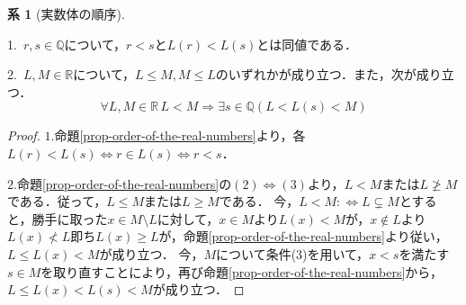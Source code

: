 \documentclass[uplatex, 12pt, dvipdfmx]{jsreport}
\theoremstyle{definition}
\newtheorem{corollary}[theorem]{系}
\theoremstyle{StatementsWithStar}
\theoremstyle{StatementsWithStar2}
\theoremstyle{StatementsWithStar3}
\theoremstyle{StatementsWithCCirc}
\theoremstyle{definition}
\begin{document}
\begin{corollary}[実数体の順序]\rm{}\label{corollary-order-of-the-real-numbers}　

    1.\, $r,s\in\mathbb{Q}$について，$r<s$と$L(r)<L(s)$とは同値である．
    
    2.\, $L,M\in\mathbb{R}$について，$L\leq M, M\leq L$のいずれかが成り立つ．また，次が成り立つ．
    \[ \forall L,M\in\mathbb{R} \, L<M \Longrightarrow \exists s\in\mathbb{Q} (L<L(s)<M) \]
\end{corollary}
\begin{proof}\rm{}
    $1.$命題\ref{prop-order-of-the-real-numbers}より，各$L(r)<L(s)\Leftrightarrow r\in L(s)\Leftrightarrow r<s$．

    $2.$命題\ref{prop-order-of-the-real-numbers}の$(2)\Leftrightarrow(3)$より，$L<M$または$L\ngeq M$である．従って，$L\le M$または$L\ge M$である．
    今，$L<M:\Leftrightarrow L\subsetneq M$とすると，勝手に取った$x\in M\setminus L$に対して，$x\in M$より$L(x)<M$が，$x\notin L$より$L(x)\nless L$即ち$L(x)\ge L$が，命題\ref{prop-order-of-the-real-numbers}より従い，$L\le L(x)<M$が成り立つ．
    今，$M$について条件(3)を用いて，$x<s$を満たす$s\in M$を取り直すことにより，再び命題\ref{prop-order-of-the-real-numbers}から，$L\le L(x)<L(s)<M$が成り立つ．
\end{proof}
\end{document}
